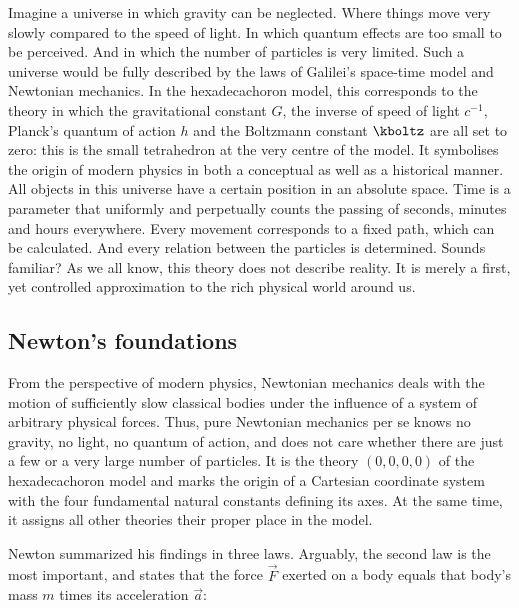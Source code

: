 \documentclass{scrartcl}
\begin{document}


\newpage {}
\label{sec:0000}

Imagine a universe in which gravity can be neglected. Where things move very slowly compared to the speed of light. In which quantum effects are too small to be perceived. And in which the number of particles is very limited. Such a universe would be fully described by the laws of Galilei's space-time model and Newtonian mechanics. In the hexadecachoron model, this corresponds to the theory in which the gravitational constant $G$, the inverse of speed of light $c^{-1}$, Planck's quantum of action $h$ and the Boltzmann constant $\kboltz$ are all set to zero: this is the small tetrahedron at the very centre of the model. It symbolises the origin of modern physics in both a conceptual as well as a historical manner.
All objects in this universe have a certain position in an absolute space. Time is a parameter that uniformly and perpetually counts the passing of seconds, minutes and hours everywhere. Every movement corresponds to a fixed path, which can be calculated. And every relation between the particles is determined. Sounds familiar? As we all know, this theory does not describe reality. It is merely a first, yet controlled approximation to the rich physical world around us.


\subsection*{Newton's foundations}

From the perspective of modern physics, Newtonian mechanics deals with the motion of sufficiently slow classical bodies under the influence of a system of arbitrary physical forces. Thus, pure Newtonian mechanics per se knows no 
gravity, no light, no quantum of action, and does not care whether there are just a few or a very large number of particles. It is the theory $(0,0,0,0)$ of the hexadecachoron model and marks the origin of a Cartesian coordinate system with the four fundamental natural constants defining its axes. At the same time, it assigns all other theories their proper place in the model.

Newton summarized his findings in three laws. Arguably, the second law is the most important, and states that the force $\vec{F}$ exerted on a body equals that body's mass $m$ times its acceleration $\vec{a}$:
\end{document}
